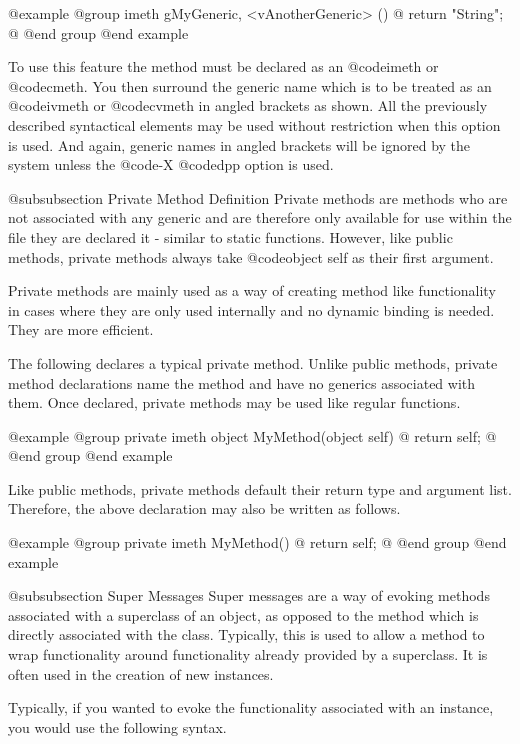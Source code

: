 @example
@group
imeth   gMyGeneric, <vAnotherGeneric> ()
@{
        return "String";
@}
@end group
@end example


To use this feature the method must be declared as an @code{imeth} or
@code{cmeth}.  You then surround the generic name which is to be
treated as an @code{ivmeth} or @code{cvmeth} in angled brackets as
shown.  All the previously described syntactical elements may be
used without restriction when this option is used.  And again,
generic names in angled brackets will be ignored by the system unless
the @code{-X} @code{dpp} option is used.












@subsubsection Private Method Definition
Private methods are methods who are not associated with any generic
and are therefore only available for use within the file they are
declared it - similar to static functions.  However, like public
methods, private methods always take @code{object self} as their
first argument.

Private methods are mainly used as a way of creating method like
functionality in cases where they are only used internally and no
dynamic binding is needed.  They are more efficient.

The following declares a typical private method.  Unlike public
methods, private method declarations name the method and have
no generics associated with them.  Once declared, private methods may
be used like regular functions.


@example
@group
private imeth   object  MyMethod(object self)
@{
        return self;
@}
@end group
@end example


Like public methods, private methods default their return type and
argument list.  Therefore, the above declaration may also be written as
follows.

@example
@group
private imeth   MyMethod()
@{
        return self;
@}
@end group
@end example


@subsubsection Super Messages
Super messages are a way of evoking methods associated with a superclass
of an object, as opposed to the method which is directly associated
with the class.  Typically, this is used to allow a method to wrap
functionality around functionality already provided by a superclass.
It is often used in the creation of new instances.

Typically, if you wanted to evoke the functionality associated with an
instance, you would use the following syntax.

